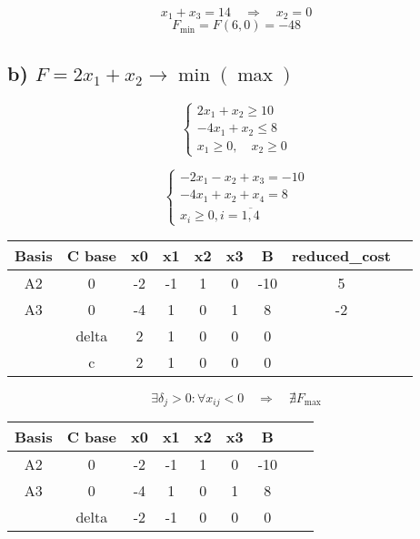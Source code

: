 \documentclass[17pt]{extarticle}
\begin{document}
\[
    x_1 + x_3 = 14 \quad \Rightarrow \quad x_2 = 0
\]
\[
    F_{\text{min}} = F(6, 0) = -48
\]

\subsection*{b) \( F = 2x_1 + x_2 \to \min (\max) \)}

\[
    \begin{cases}
        2x_1 + x_2 \geq 10 \\
        -4x_1 + x_2 \leq 8 \\
        x_1 \geq 0, \quad x_2 \geq 0
    \end{cases}
\]

\[
    \begin{cases}
        -2x_1 - x_2 + x_3 = -10 \\
        -4x_1 + x_2 + x_4 = 8   \\
        x_i \geq 0, i=\overline{1, 4}
    \end{cases}
\]

\begin{table}[H]
    \centering
    \begin{tabular}{c|c|cccccc|c}
        \toprule
        Basis & C base & x0 & x1 & x2 & x3 & B   & reduced\_cost \\
        \midrule
        A2    & 0      & -2 & -1 & 1  & 0  & -10 & 5             \\
        A3    & 0      & -4 & 1  & 0  & 1  & 8   & -2            \\
        \midrule
              & delta  & 2  & 1  & 0  & 0  & 0   &               \\
              & c      & 2  & 1  & 0  & 0  & 0   &               \\
        \bottomrule
    \end{tabular}
\end{table}

\[
    \exists \delta_j > 0: \forall x_{ij} < 0 \quad \Rightarrow \quad \nexists F_{\text{max}}
\]

\begin{table}[H]
    \centering
    \begin{tabular}{c|c|cccccc|c}
        \toprule
        Basis & C base & x0 & x1 & x2 & x3 & B   \\
        \midrule
        A2    & 0      & -2 & -1 & 1  & 0  & -10 \\
        A3    & 0      & -4 & 1  & 0  & 1  & 8   \\
        \midrule
              & delta  & -2 & -1 & 0  & 0  & 0   \\
        \bottomrule
    \end{tabular}
\end{table}
\end{document}
